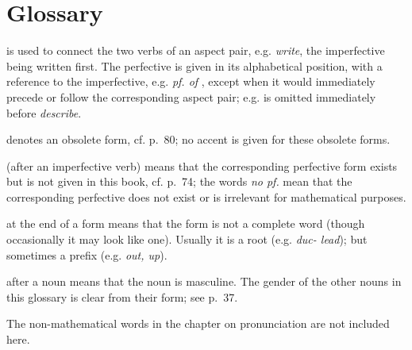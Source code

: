 \clearpage
\chapter*{Glossary}
\newcommand{\glosscorrnote}[1]{\footnotemark\footnotetext{{\scriptsize\fontspec{Noto Serif}\textbf{校勘：}#1}}}
\begingroup
\cyrillicfont
\small
\setlength{\parindent}{0pt}
\setlength{\parskip}{0.55em}
\begin{description}[style=multiline,leftmargin=12mm,labelwidth=9mm,font=\normalfont\itshape]
\item[$\sim$] is used to connect the two verbs of an aspect pair, e.g.\quad
{} \emph{write}, the imperfective being written first.
The perfective is given in its alphabetical position, with a reference to the imperfective, e.g.\quad
{} \emph{pf. of} , except when it would immediately precede or follow the corresponding aspect pair; e.g.\quad
{} is omitted immediately before  \emph{describe}.
\item[*] denotes an obsolete form, cf. p.~80; no accent is given for these obsolete forms.
\item[$\dagger$] (after an imperfective verb) means that the corresponding perfective form exists but is not given in this book, cf. p.~74; the words \emph{no pf.} mean that the corresponding perfective does not exist or is irrelevant for mathematical purposes.
\item[-] at the end of a form means that the form is not a complete word (though occasionally it may look like one). Usually it is a root (e.g.  \emph{duc- lead}); but sometimes a prefix (e.g.  \emph{out, up}).
\item[\emph{masc.}] after a noun means that the noun is masculine. The gender of the other nouns in this glossary is clear from their form; see p.~37.
\end{description}
The non-mathematical words in the chapter on pronunciation are not included here.
\endgroup

